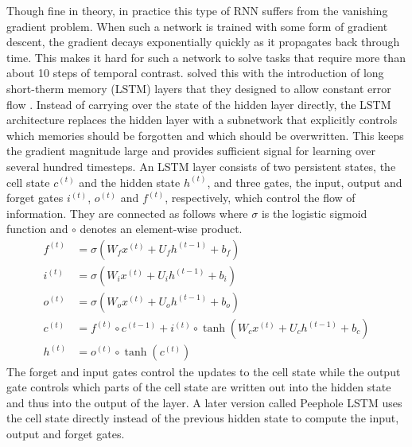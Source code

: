 Though fine in theory, in practice this type of RNN suffers from the vanishing
gradient problem. When such a network is trained with some form of gradient
descent, the gradient decays exponentially quickly as it propagates back through
time. This makes it hard for such a network to solve tasks that require more
than about 10 steps of temporal contrast. \citeauthor{lstm} solved this with the
introduction of long short-therm memory (LSTM) layers that they designed to
allow constant error flow \cite{lstm}. Instead of carrying over the state of the
hidden layer directly, the LSTM architecture replaces the hidden layer with a
subnetwork that explicitly controls which memories should be forgotten and which
should be overwritten. This keeps the gradient magnitude large and provides
sufficient signal for learning over several hundred timesteps. An LSTM layer
consists of two persistent states, the cell state $c^{(t)}$ and the hidden state
$h^{(t)}$, and three gates, the input, output and forget gates $i^{(t)}$,
$o^{(t)}$ and $f^{(t)}$, respectively, which control the flow of information.
They are connected as follows where $\sigma$ is the logistic sigmoid function
and $\circ$ denotes an element-wise product.
\begin{align*}
  f^{(t)} & = \sigma\left( W_{f}x^{(t)} + U_{f}h^{(t - 1)} + b_{f} \right)\\
  i^{(t)} & = \sigma\left( W_{i}x^{(t)} + U_{i}h^{(t - 1)} + b_{i} \right)\\
  o^{(t)} & = \sigma\left( W_{o}x^{(t)} + U_{o}h^{(t - 1)} + b_{o} \right)\\
  c^{(t)} & = f^{(t)} \circ c^{(t - 1)} + i^{(t)} \circ \tanh\left( W_{c}x^{(t)} + U_{c}h^{(t - 1)} + b_{c} \right)\\
  h^{(t)} & = o^{(t)} \circ \tanh\left( c^{(t)} \right)
\end{align*}
The forget and input gates control the updates to the cell state while the
output gate controls which parts of the cell state are written out into the
hidden state and thus into the output of the layer. A later version called
Peephole LSTM uses the cell state directly instead of the previous hidden state
to compute the input, output and forget gates.


